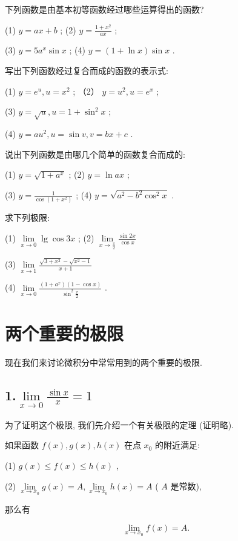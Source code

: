 \documentclass[lang=cn,newtx,10pt,scheme=chinese]{elegantbook}
\begin{document}
\begin{problemset}[练习]

\item 下列函数是由基本初等函数经过哪些运算得出的函数?

(1) \(y = {ax} + b\) ; (2) \(y = \frac{1 + {x}^{2}}{ax}\) ;

(3) \(y = 5{a}^{x}\sin x\) ; (4) \(y = \left( {1 + \ln x}\right) \sin x\) .

\item 写出下列函数经过复合而成的函数的表示式:

(1) \(y = {e}^{u},u = {x}^{2}\) ; （2） \(y = {u}^{2},u = {e}^{x}\) ;

(3) \(y = \sqrt{u},u = 1 + {\sin }^{2}x\) ;

(4) \(y = a{u}^{2},u = \sin v,v = {bx} + c\) .

\item 说出下列函数是由哪几个简单的函数复合而成的:

(1) \(y = \sqrt{1 + {a}^{x}}\) ; (2) \(y = \ln {ax}\) ;

(3) \(y = \frac{1}{\cos \left( {1 + {x}^{2}}\right) }\) ; (4) \(y = \sqrt{{a}^{2} - {b}^{2}{\cos }^{2}x}\) .

\item 求下列极限:

(1) \(\mathop{\lim }\limits_{{x \rightarrow 0}}\lg \cos {3x}\) ; (2) \(\mathop{\lim }\limits_{{x \rightarrow \frac{\pi }{2}}}\frac{\sin {2x}}{\cos x}\)

(3) \(\mathop{\lim }\limits_{{x \rightarrow 1}}\frac{\sqrt{3 + {x}^{2}} - \sqrt{{x}^{2} - 1}}{x + 1}\)

(4) \(\mathop{\lim }\limits_{{x \rightarrow 0}}\frac{\left( {1 + {a}^{x}}\right) \left( {1 - \cos x}\right) }{{\sin }^{2}\frac{x}{2}}\) .

\end{problemset}
\section{两个重要的极限}

现在我们来讨论微积分中常常用到的两个重要的极限.


\subsection*{1.\(\mathop{\lim }\limits_{{x \rightarrow 0}}\frac{\sin x}{x} = 1\)}



为了证明这个极限, 我们先介绍一个有关极限的定理 (证明略).
\begin{theorem}[定理]
如果函数 \(f\left( x\right) ,g\left( x\right) ,h\left( x\right)\) 在点 \({x}_{0}\) 的附近满足:

(1) \(g\left( x\right) \leq f\left( x\right) \leq h\left( x\right)\) ,

(2) \(\mathop{\lim }\limits_{{x \rightarrow {x}_{0}}}g\left( x\right) = A,\mathop{\lim }\limits_{{x \rightarrow {x}_{0}}}h\left( x\right) = A\) ( \(A\) 是常数),

那么有

\[
\mathop{\lim }\limits_{{x \rightarrow {x}_{0}}}f\left( x\right) = A\text{. }
\]

\end{theorem}
\end{document}
